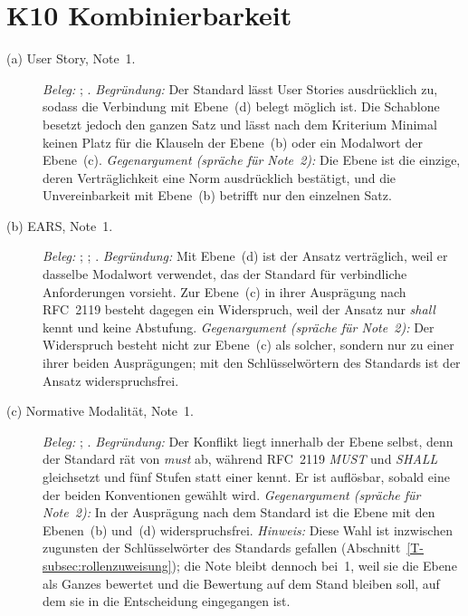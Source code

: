 \documentclass[11pt,a4paper]{report}
\begin{document}
\section{K10 Kombinierbarkeit}
\label{sec:anhang-k10}

\begin{description}
  \item[(a) User Story, Note~1.]
  \emph{Beleg:} \cite[Abschn.~5.2.4 NOTE~2]{iso29148};
  \cite[Abschn.~1 und Tab.~1]{lucassen2016qus}.
  \emph{Begründung:} Der Standard lässt User Stories ausdrücklich zu,
  sodass die Verbindung mit Ebene~(d) belegt möglich ist. Die Schablone
  besetzt jedoch den ganzen Satz und lässt nach dem Kriterium Minimal
  keinen Platz für die Klauseln der Ebene~(b) oder ein Modalwort der
  Ebene~(c).
  \emph{Gegenargument (spräche für Note~2):} Die Ebene ist die einzige,
  deren Verträglichkeit eine Norm ausdrücklich bestätigt, und die
  Unvereinbarkeit mit Ebene~(b) betrifft nur den einzelnen Satz.

  \item[(b) EARS, Note~1.]
  \emph{Beleg:} \cite[Abschn.~4.1]{mavin2009ears};
  \cite[Abschn.~5.2.4]{iso29148}; \cite[Abschn.~1--5]{rfc2119}.
  \emph{Begründung:} Mit Ebene~(d) ist der Ansatz verträglich, weil er
  dasselbe Modalwort verwendet, das der Standard für verbindliche
  Anforderungen vorsieht. Zur Ebene~(c) in ihrer Ausprägung nach
  RFC~2119 besteht dagegen ein Widerspruch, weil der Ansatz nur
  \emph{shall} kennt und keine Abstufung.
  \emph{Gegenargument (spräche für Note~2):} Der Widerspruch besteht
  nicht zur Ebene~(c) als solcher, sondern nur zu einer ihrer beiden
  Ausprägungen; mit den Schlüsselwörtern des Standards ist der Ansatz
  widerspruchsfrei.

  \item[(c) Normative Modalität, Note~1.]
  \emph{Beleg:} \cite[Abschn.~1--5]{rfc2119};
  \cite[Abschn.~5.2.4]{iso29148}.
  \emph{Begründung:} Der Konflikt liegt innerhalb der Ebene selbst, denn
  der Standard rät von \emph{must} ab, während RFC~2119 \emph{MUST} und
  \emph{SHALL} gleichsetzt und fünf Stufen statt einer kennt. Er ist
  auflösbar, sobald eine der beiden Konventionen gewählt wird.
  \emph{Gegenargument (spräche für Note~2):} In der Ausprägung nach dem
  Standard ist die Ebene mit den Ebenen~(b) und~(d) widerspruchsfrei.
  \emph{Hinweis:} Diese Wahl ist inzwischen zugunsten der
  Schlüsselwörter des Standards gefallen
  (Abschnitt~\ref{T-subsec:rollenzuweisung}); die Note bleibt dennoch
  bei~1, weil sie die Ebene als Ganzes bewertet und die Bewertung auf
  dem Stand bleiben soll, auf dem sie in die Entscheidung eingegangen
  ist.


\end{description}
\end{document}
